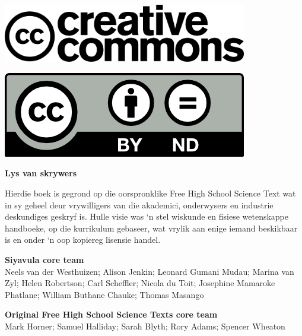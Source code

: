 \vspace*{4in}

\begin{center}
\begin{minipage}{0.6\textwidth}
\includegraphics[width=0.8\textwidth]{title_images/cc2.png}
\end{minipage}
\begin{minipage}{0.3\textwidth}
\includegraphics[width=0.8\textwidth]{title_images/cc1.png}
\end{minipage}
\end{center}

\newpage
\thispagestyle{empty}


\begin{flushleft} \textbf{\LARGE  Lys van skrywers} \end{flushleft}

{Hierdie boek is gegrond op die oorspronklike Free High School Science Text wat in sy geheel deur vrywilligers van die akademici, onderwysers en industrie deskundiges geskryf is. Hulle visie was ‘n stel wiskunde en fisiese wetenskappe handboeke, op die kurrikulum gebaseer, wat vrylik aan enige iemand beskikbaar is en onder ‘n oop kopiereg lisensie handel.} \par

\textbf{\large Siyavula core team} \\

Neels van der Westhuizen; Alison Jenkin; Leonard Gumani Mudau; Marina van Zyl; Helen Robertson; Carl Scheffler; Nicola du Toit; Josephine Mamaroke Phatlane; William Buthane Chauke; Thomas Masango \par

\textbf{\large Original Free High School Science Texts core team}\\

Mark Horner; Samuel Halliday; Sarah Blyth; Rory Adams; Spencer Wheaton \par 


